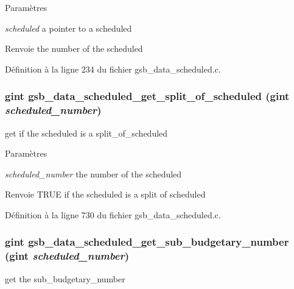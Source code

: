 \begin{DoxyParams}{Paramètres}
\item[{\em scheduled}]a pointer to a scheduled\end{DoxyParams}
\begin{DoxyReturn}{Renvoie}
the number of the scheduled 
\end{DoxyReturn}


Définition à la ligne 234 du fichier gsb\_\-data\_\-scheduled.c.

\subsubsection[{gsb\_\-data\_\-scheduled\_\-get\_\-split\_\-of\_\-scheduled}]{\setlength{\rightskip}{0pt plus 5cm}gint gsb\_\-data\_\-scheduled\_\-get\_\-split\_\-of\_\-scheduled (gint {\em scheduled\_\-number})}\label{gsb__data__scheduled_8c_ae2bbf34058b508781bd4af1292b64d6a}
get if the scheduled is a split\_\-of\_\-scheduled


\begin{DoxyParams}{Paramètres}
\item[{\em scheduled\_\-number}]the number of the scheduled\end{DoxyParams}
\begin{DoxyReturn}{Renvoie}
TRUE if the scheduled is a split of scheduled 
\end{DoxyReturn}


Définition à la ligne 730 du fichier gsb\_\-data\_\-scheduled.c.

\subsubsection[{gsb\_\-data\_\-scheduled\_\-get\_\-sub\_\-budgetary\_\-number}]{\setlength{\rightskip}{0pt plus 5cm}gint gsb\_\-data\_\-scheduled\_\-get\_\-sub\_\-budgetary\_\-number (gint {\em scheduled\_\-number})}\label{gsb__data__scheduled_8c_a6e325242a5a8187b876eb57f6e1d10ed}
get the sub\_\-budgetary\_\-number


